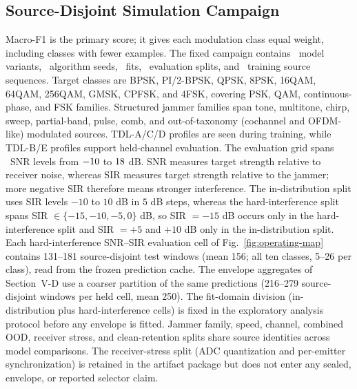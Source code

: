 \documentclass[letterpaper,journal]{IEEEtran}
\begin{document}
\subsection{Source-Disjoint Simulation Campaign}
Macro-F1 is the primary score; it gives each modulation class equal weight,
including classes with fewer examples.
The fixed campaign contains \ProtocolModelCount\ model variants,
\ProtocolSeedCount\ algorithm seeds, \ProtocolFitCount\ fits,
\ProtocolSplitCount\ evaluation splits, and \ProtocolTrainSources\ training
source sequences. Target classes are BPSK, PI/2-BPSK, QPSK, 8PSK, 16QAM, 64QAM, 256QAM, GMSK,
CPFSK, and 4FSK, covering PSK, QAM, continuous-phase, and FSK families.
Structured jammer families span tone, multitone, chirp, sweep, partial-band,
pulse, comb, and out-of-taxonomy (cochannel and OFDM-like) modulated sources. TDL-A/C/D
profiles are seen during training, while TDL-B/E profiles support held-channel
evaluation. The evaluation grid spans \SnrGridCount\ SNR levels from
$-10$ to $18$ dB. SNR measures target strength relative to
receiver noise, whereas SIR measures target strength relative to the jammer;
more negative SIR therefore means stronger interference. The in-distribution split uses SIR levels
$-10$ to $10$ dB in $5$ dB steps, whereas the hard-interference split spans
SIR $\in\{-15,-10,-5,0\}$ dB, so SIR $=-15$ dB occurs only in the
hard-interference split and SIR $=+5$ and $+10$ dB only in the in-distribution
split. Each hard-interference SNR--SIR evaluation cell of
Fig.~\ref{fig:operating-map} contains 131--181 \mbox{source-disjoint} test windows
(mean 156; all ten classes, 5--26 per class), read from the frozen prediction
cache. The envelope aggregates of Section~V-D use a coarser partition of the
same predictions (216--279 \mbox{source-disjoint} windows per held cell, mean 250). The fit-domain division
(in-distribution plus hard-interference cells) is fixed in the exploratory
analysis protocol before any envelope is fitted. Jammer family, speed, channel, combined OOD, receiver stress, and
clean-retention splits share source identities across model comparisons. The
receiver-stress split (ADC quantization and per-emitter synchronization) is
retained in the artifact package but does not enter any sealed, envelope, or
reported selector claim.
\end{document}
